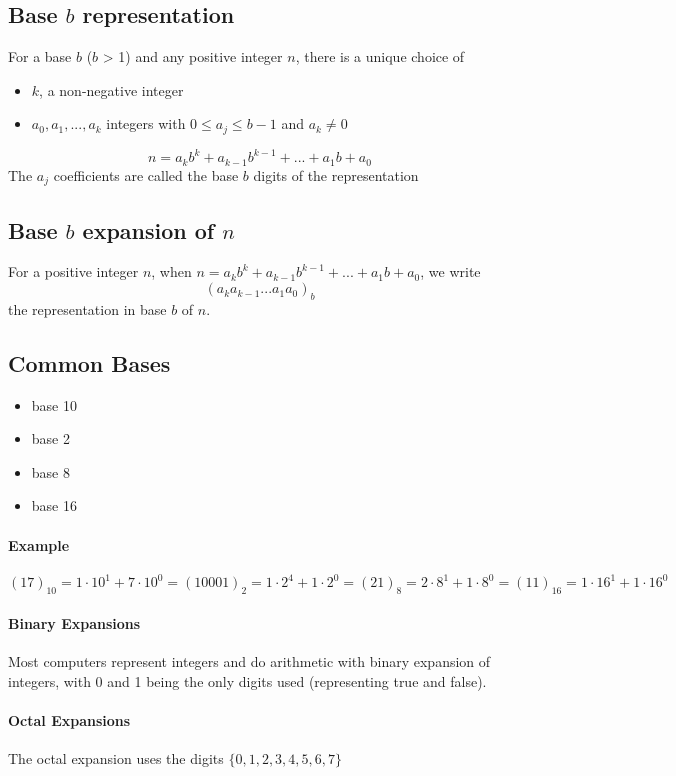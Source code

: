 \documentclass[10pt,a4paper]{book}
\begin{document}
\subsection{Base \texorpdfstring{$b$}{b} representation}
For a base $b$ ($b$ > 1) and any positive integer $n$, there is a unique choice of 
\begin{itemize}
\item $k$, a non-negative integer
\item $a_0,a_1,...,a_k$ integers with $0 \leq a_j \leq b-1$ and $a_k \neq 0$
\end{itemize}
\[n=a_kb^k+a_{k-1}b^{k-1}+...+a_1b+a_0\]
The $a_j$ coefficients are called the base $b$ digits of the representation
\subsection{Base \texorpdfstring{$b$}{b} expansion of \texorpdfstring{$n$}{n}}
For a positive integer $n$, when $n=a_{k}b^{k}+a_{k-1}b^{k-1}+...+a_1b+a_0$, we write \[(a_k a_{k-1} ... a_1 a_0)_b \] the representation in base $b$ of $n$.
\subsection{Common Bases}
\begin{itemize}
\item{ base 10}
\item{ base 2}
\item{ base 8}
\item{ base 16}
\end{itemize}
\paragraph*{Example}
$(17)_{10} = 1\cdot 10^1 + 7\cdot 10^0 = (10001)_2 = 1\cdot 2^4 + 1\cdot 2^0 = (21)_8 = 2\cdot 8^1 + 1\cdot 8^0 = (11)_{16} = 1\cdot 16^1 + 1\cdot 16^0$
\paragraph*{Binary Expansions}
Most computers represent integers and do arithmetic with binary expansion of integers, with 0 and 1 being the only digits used (representing true and false).
\paragraph*{Octal Expansions}
The octal expansion uses the digits $\{0,1,2,3,4,5,6,7\}$
\end{document}
